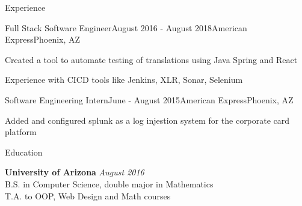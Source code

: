\documentclass{resume} %
\begin{document}
\begin{rSection}{Experience}
\begin{rSubsection}{Full Stack Software Engineer}{August 2016 - August 2018}{American Express}{Phoenix, AZ}
\item Created a tool to automate testing of translations using Java Spring and React
\item Experience with CICD tools like Jenkins, XLR, Sonar, Selenium
\end{rSubsection}

\begin{rSubsection}{Software Engineering Intern}{June - August 2015}{American Express}{Phoenix, AZ}
\item Added and configured splunk as a log injestion system for the corporate card platform

\end{rSubsection}

\end{rSection}

\begin{rSection}{Education}
	
	{\bf University of Arizona} \hfill {\em August 2016} \\ 
	B.S. in Computer Science, double major in Mathematics  \smallskip \\
	\smallskip T.A. to OOP, Web Design and Math courses
\end{rSection}
\end{document}
